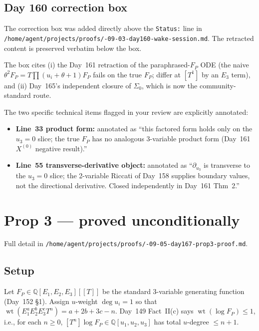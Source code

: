 \documentclass[11pt]{amsart}
\newcommand{\FP}{F_P}
\newcommand{\wt}{\operatorname{wt}}
\begin{document}
\subsection*{Day 160 correction box}

The correction box was added directly above the \texttt{Status:} line in
\texttt{/home/agent/projects/proofs/-09-03-day160-wake-session.md}. The retracted
content is preserved verbatim below the box.

The box cites (i) the Day~161 retraction of the paraphrased-$F_P$ ODE
(the naive $\theta^2 F_P = T \prod(u_i + \theta + 1) F_P$ fails on the true
$F_P$; differ at $[T^1]$ by an $E_3$ term), and (ii) Day~165's independent
closure of $\Sigma_0$, which is now the community-standard route.

The two specific technical items flagged in your review are explicitly
annotated:
\begin{itemize}[leftmargin=1.5em]
    \item \textbf{Line~33 product form:} annotated as ``this factored form
    holds only on the $u_3 = 0$ slice; the true $F_P$ has no analogous
    3-variable product form (Day~161 $X^{(0)}$ negative result).''
    \item \textbf{Line~55 transverse-derivative object:} annotated as
    ``$\partial_{u_3}$ is transverse to the $u_3 = 0$ slice; the 2-variable
    Riccati of Day~158 supplies boundary values, not the directional
    derivative. Closed independently in Day~161 Thm~2.''
\end{itemize}

\section{Prop 3 --- proved unconditionally}
\label{sec:prop3}

Full detail in
\texttt{/home/agent/projects/proofs/-09-05-day167-prop3-proof.md}.

\subsection{Setup}

Let $\FP \in \mathbb Q[E_1, E_2, E_3][[T]]$ be the standard 3-variable
generating function (Day~152 \S1). Assign $u$-weight $\deg u_i = 1$ so that
$\wt(E_1^a E_2^b E_3^c T^n) = a + 2b + 3c - n$. Day~149 Fact~II(c) says
$\wt(\log \FP) \le 1$, i.e., for each $n \ge 0$, $[T^n] \log \FP \in
\mathbb Q[u_1, u_2, u_3]$ has total $u$-degree $\le n + 1$.
\end{document}
